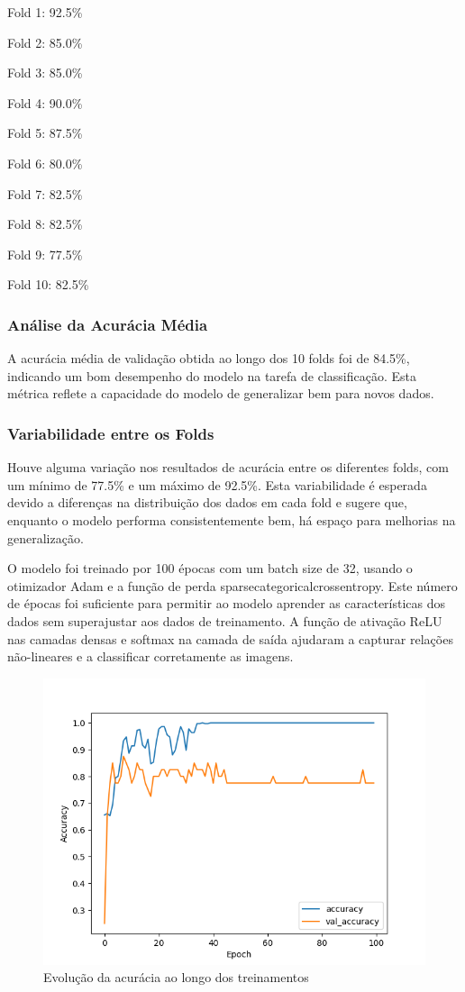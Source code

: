 Fold 1: 92.5\%

Fold 2: 85.0\%

Fold 3: 85.0\%

Fold 4: 90.0\%

Fold 5: 87.5\%

Fold 6: 80.0\%

Fold 7: 82.5\%

Fold 8: 82.5\%

Fold 9: 77.5\%

Fold 10: 82.5\%

\subsubsection*{Análise da Acurácia Média}

A acurácia média de validação obtida ao longo dos 10 folds foi de 84.5\%, indicando um bom desempenho do modelo na tarefa de classificação. Esta métrica reflete a capacidade do modelo de generalizar bem para novos dados.

\subsubsection*{Variabilidade entre os Folds}

Houve alguma variação nos resultados de acurácia entre os diferentes folds, com um mínimo de 77.5\% e um máximo de 92.5\%. Esta variabilidade é esperada devido a diferenças na distribuição dos dados em cada fold e sugere que, enquanto o modelo performa consistentemente bem, há espaço para melhorias na generalização.

O modelo foi treinado por 100 épocas com um batch size de 32, usando o otimizador Adam e a função de perda sparse\textunderscore categorical\textunderscore crossentropy. Este número de épocas foi suficiente para permitir ao modelo aprender as características dos dados sem superajustar aos dados de treinamento. A função de ativação ReLU nas camadas densas e softmax na camada de saída ajudaram a capturar relações não-lineares e a classificar corretamente as imagens.

\begin{figure}[!h]
    \centering
    \caption{Evolução da acurácia ao longo dos treinamentos}
    \label{Gráfico 3}
    \includegraphics[width=0.7\linewidth]{Illustrations/Figure_1.png}
    \end{figure}